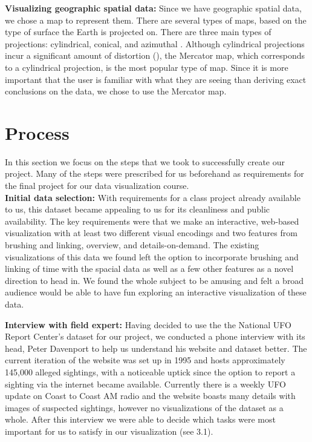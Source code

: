 \documentclass[journal]{vgtc}                %
\begin{document}
\textbf{Visualizing geographic spatial data:}
Since we have geographic spatial data, we chose a map to represent them. There are several types of maps, based on the type of surface the Earth is projected on. There are three main types of projections: cylindrical, conical, and azimuthal \cite{projections}. Although cylindrical projections incur a significant amount of distortion (\cite{distortion}), the Mercator map, which corresponds to a cylindrical projection, is the most popular type of map. Since it is more important that the user is familiar with what they are seeing than deriving exact conclusions on the data, we chose to use the Mercator map.

\section{Process}
In this section we focus on the steps that we took to successfully create our project. Many of the steps were prescribed for us beforehand as requirements for the final project for our data visualization course. \\

\textbf{Initial data selection:} With requirements for a class project already available to us, this dataset became appealing to us for its cleanliness and public availability. The key requirements were that we make an interactive, web-based visualization with at least two different visual encodings and two features from brushing and linking, overview, and details-on-demand. The existing visualizations of this data we found \cite{dataduo} left the option to incorporate brushing and linking of time with the spacial data as well as a few other features as a novel direction to head in. We found the whole subject to be amusing and felt a broad audience would be able to have fun exploring an interactive visualization of these data.

\textbf{Interview with field expert:} Having decided to use the the National UFO Report Center's dataset for our project, we conducted a phone interview with its head, Peter Davenport to help us understand his website and dataset better. The current iteration of the website was set up in 1995 and hosts approximately 145,000 alleged sightings, with a noticeable uptick since the option to report a sighting via the internet became available. Currently there is a weekly UFO update on Coast to Coast AM radio and the website boasts many details with images of suspected sightings, however no visualizations of the dataset as a whole. After this interview we were able to decide which tasks were most important for us to satisfy in our visualization (see 3.1).
\end{document}
